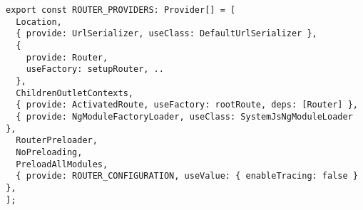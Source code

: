 \begin{verbatim}
export const ROUTER_PROVIDERS: Provider[] = [
  Location,
  { provide: UrlSerializer, useClass: DefaultUrlSerializer },
  {
    provide: Router,
    useFactory: setupRouter, ..
  },
  ChildrenOutletContexts,
  { provide: ActivatedRoute, useFactory: rootRoute, deps: [Router] },
  { provide: NgModuleFactoryLoader, useClass: SystemJsNgModuleLoader },
  RouterPreloader,
  NoPreloading,
  PreloadAllModules,
  { provide: ROUTER_CONFIGURATION, useValue: { enableTracing: false } },
];
\end{verbatim}
